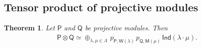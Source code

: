 \documentclass[reqno]{amsart}
\newcommand{\oV}{\overline{V}}
\renewcommand{\_}[1]{_{\left( #1 \right)}}
\renewcommand{\^}[1]{^{\left( #1 \right)}}
\newcommand{\ot}{{\otimes}}
\newcommand\fInd{\mathsf{Ind}}
\newcommand\fL{\mathsf{L}}
\newcommand\fM{\mathsf{M}}
\newcommand\fP{\mathsf{P}}
\newcommand\fQ{\mathsf{Q}}
\newcommand\fW{\mathsf{W}}
\newcommand{\D}{\mathcal{D}}
\newcommand\Hom{\operatorname{Hom}}
\theoremstyle{plain}
\newtheorem{theorem}[lema]{Theorem}
\theoremstyle{definition}
\theoremstyle{remark}
\begin{document}
% 
% 

\subsection{Tensor product of projective modules}

\begin{theorem}\label{teo:tensor prod of proj}
Let $\fP$ and $\fQ$ be projective modules. Then
\begin{align*}
\fP\ot\fQ\simeq\oplus_{\lambda,\mu\in\Lambda}\,p_{\fP,\fW(\lambda)}\,p_{\fQ,\fM(\mu)}\,\fInd(\lambda\cdot\mu).
\end{align*}
\end{theorem}
\end{document}
